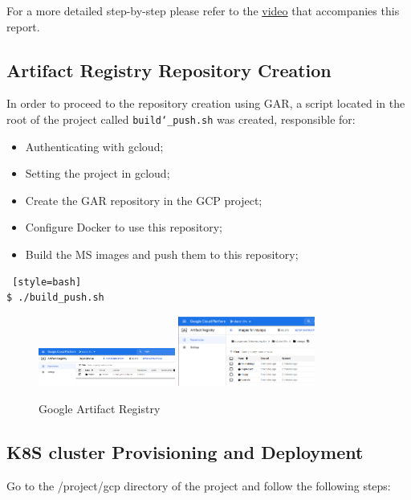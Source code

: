 \documentclass[12pt,a4paper,oneside]{report}
\begin{document}
For a more detailed step-by-step please refer to the \href{https://youtu.be/PeXhR1QCIVk?t=267}{video} that accompanies this report.

\subsection{Artifact Registry Repository Creation}

In order to proceed to the repository creation using \ac{GAR}, a script located in the root of the project called \texttt{build\char`_push.sh} was created, responsible for:

\begin{itemize}
\item Authenticating with gcloud;
\item Setting the project in gcloud;
\item Create the \ac{GAR} repository in the \ac{GCP} project;
\item Configure Docker to use this repository;
\item Build the \ac{MS} images and push them to this repository;
\end{itemize}

\begin{lstlisting} [style=bash]
$ ./build_push.sh
\end{lstlisting}

\begin{figure}[htb]
\centering
  \centering
  {\includegraphics[width=0.4\textwidth]{./pictures/repo.png}}
  \hfill
  {\includegraphics[width=0.4\textwidth]{./pictures/repofiles.png}}
\caption{Google Artifact Registry}
\label{fig:Artifact Registry}
\end{figure}


\subsection{K8S cluster Provisioning and Deployment}

Go to the /project/gcp directory of the project and follow the following steps:
\end{document}
